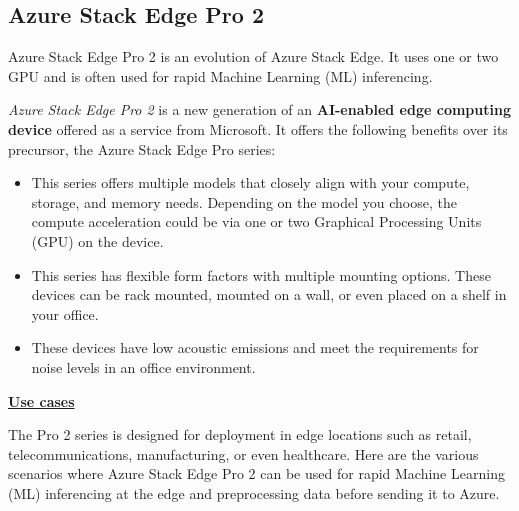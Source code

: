 \documentclass[a4paper]{article}
\begin{document}
    \newpage

    \subsection{Azure Stack Edge Pro 2}\label{subsection: azure stack edge pro 2}

    Azure Stack Edge Pro 2 is an evolution of Azure Stack Edge. It uses one or two GPU and is often used for rapid Machine Learning (ML) inferencing.\newline

    \noindent
    \emph{Azure Stack Edge Pro 2} is a new generation of an \textbf{AI-enabled edge computing device} offered as a service from Microsoft. It offers the following benefits over its precursor, the Azure Stack Edge Pro series:
    \begin{itemize}
        \item This series offers multiple models that closely align with your compute, storage, and memory needs. Depending on the model you choose, the compute acceleration could be via one or two Graphical Processing Units (GPU) on the device.
        
        \item This series has flexible form factors with multiple mounting options. These devices can be rack mounted, mounted on a wall, or even placed on a shelf in your office.
        
        \item These devices have low acoustic emissions and meet the requirements for noise levels in an office environment.
    \end{itemize}
    \begin{flushleft}
        \textbf{\underline{Use cases}}
    \end{flushleft}
    The Pro 2 series is designed for deployment in edge locations such as retail, telecommunications, manufacturing, or even healthcare. Here are the various scenarios where Azure Stack Edge Pro 2 can be used for rapid Machine Learning (ML) inferencing at the edge and preprocessing data before sending it to Azure.
\end{document}
